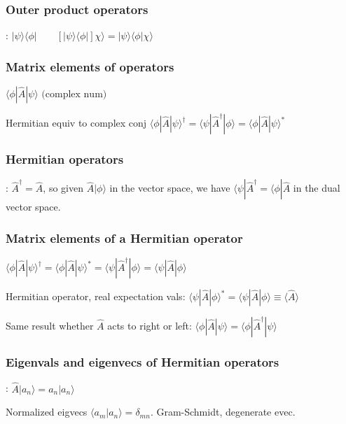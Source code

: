 \subsubsection{Outer product operators}: $| \psi \rangle \langle \phi | \qquad [|\psi \rangle \langle \phi |] \chi \rangle  = | \psi \rangle \langle \phi | \chi \rangle$

\subsubsection{Matrix elements of operators}
$\langle \phi | \widehat{A} | \psi \rangle \textrm{ (complex num)}$

Hermitian equiv to complex conj $\langle \phi | \widehat{A} | \psi \rangle^{\dag} = \langle \psi | \widehat{A}^{\dag} | \phi \rangle = \langle \phi | \widehat{A} | \psi \rangle ^*$

\subsubsection{Hermitian operators}: $\widehat{A}^{\dag} = \widehat{A}$, so given $\widehat{A} | \phi \rangle$ in the vector space, we have $\langle \psi | \widehat{A}^{\dag} = \langle \phi | \widehat{A}$ in the dual vector space.

\subsubsection{Matrix elements of a Hermitian operator}
$\langle \phi | \widehat{A} | \psi \rangle^{\dag} = \langle \phi | \widehat{A} | \psi \rangle^* = \langle \psi | \widehat{A}^{\dag} | \phi \rangle = \langle \psi | \widehat{A} | \phi \rangle$

Hermitian operator, real expectation vals: $\langle \psi | \widehat{A} | \phi \rangle ^* = \langle \psi | \widehat{A} | \phi \rangle \equiv \langle \widehat{A} \rangle$

Same result whether $\widehat{A}$ acts to right or left: $\langle \phi | \widehat{A} | \psi \rangle = \langle \phi | \widehat{A}^{\dag} | \psi \rangle$

\subsubsection{Eigenvals and eigenvecs of Hermitian operators}: $\widehat{A} |a_n \rangle = a_n | a_n \rangle$

Normalized eigvecs $\langle a_m | a_n \rangle = \delta_{mn}$. Gram-Schmidt, degenerate evec.

